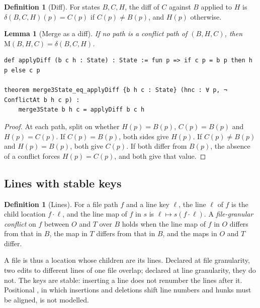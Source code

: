 \documentclass[11pt,letterpaper]{article}
\newtheorem{lemma}[theorem]{Lemma}
\theoremstyle{definition}
\newtheorem{definition}[theorem]{Definition}
\theoremstyle{remark}
\newcommand{\op}[1]{\mathrm{#1}}
\newcommand{\mrg}{\op{M}}
\begin{document}
\begin{definition}[Diff]
\label{def:mcbl:diff}
For states $B,C,H$, the diff of $C$ against $B$ applied to $H$ is $\delta(B,C,H)(p)=C(p)$ if $C(p)\neq B(p)$, and $H(p)$ otherwise.
\end{definition}

\begin{lemma}[Merge as a diff]
\label{lem:mcbl:diff}
If no path is a conflict path of $(B,H,C)$, then $\mrg(B,H,C)=\delta(B,C,H)$.
\end{lemma}

\begin{lstlisting}[language=Lean,caption={Diffs, and the merge as a diff (\texttt{YonedaTx/Merge.lean})},label={lst:mcbl:diff}]
def applyDiff (b c h : State) : State := fun p => if c p = b p then h p else c p

theorem merge3State_eq_applyDiff {b h c : State} (hnc : ∀ p, ¬ ConflictAt b h c p) :
    merge3State b h c = applyDiff b c h
\end{lstlisting}

\begin{proof}
At each path, split on whether $H(p)=B(p)$, $C(p)=B(p)$ and $H(p)=C(p)$. If $C(p)=B(p)$, both sides give $H(p)$. If $C(p)\neq B(p)$ and $H(p)=B(p)$, both give $C(p)$. If both differ from $B(p)$, the absence of a conflict forces $H(p)=C(p)$, and both give that value.
\end{proof}

\subsection{Lines with stable keys}

\begin{definition}[Lines]
\label{def:mcbl:lines}
For a file path $f$ and a line key $\ell$, the line $\ell$ of $f$ is the child location $f\cdot\ell$, and the line map of $f$ in $s$ is $\ell\mapsto s(f\cdot\ell)$. A \emph{file-granular conflict} on $f$ between $O$ and $T$ over $B$ holds when the line map of $f$ in $O$ differs from that in $B$, the map in $T$ differs from that in $B$, and the maps in $O$ and $T$ differ.
\end{definition}

A file is thus a location whose children are its lines. Declared at file granularity, two edits to different lines of one file overlap; declared at line granularity, they do not. The keys are stable: inserting a line does not renumber the lines after it. Positional , in which insertions and deletions shift line numbers and hunks must be aligned, is not modelled.
\end{document}

